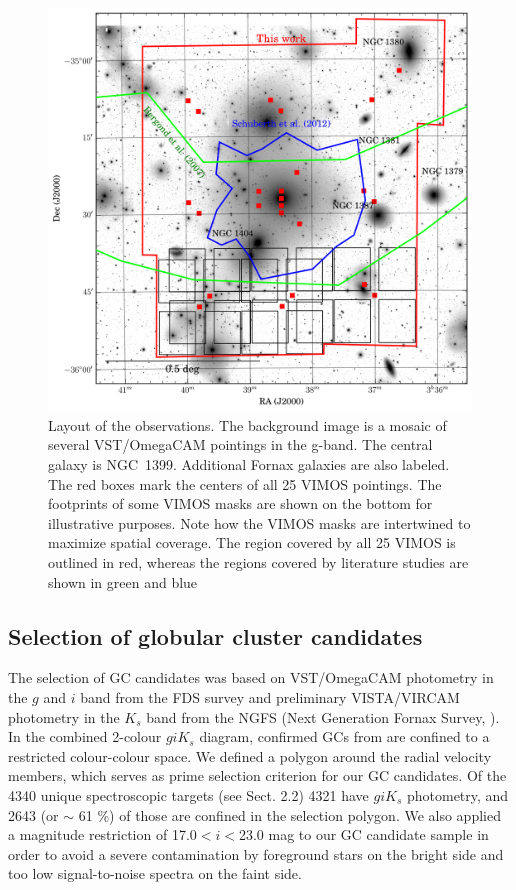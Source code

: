 \documentclass[useAMS,usenatbib]{mn2e}
\begin{document}
\begin{figure}
\centering
\includegraphics[scale=0.7]{figures/fov.png} 
\caption{Layout of the observations. The background image is a mosaic of several VST/OmegaCAM pointings in the g-band. The central galaxy is NGC~1399. Additional Fornax galaxies are also labeled. The red boxes mark the centers of all 25 VIMOS pointings. The footprints of some VIMOS masks are shown on the bottom for illustrative purposes. Note how the VIMOS masks are intertwined to maximize spatial coverage. The region covered by all 25 VIMOS is outlined in red, whereas the regions covered by literature studies are shown in green \citep{Bergond07} and blue \citep{Schuberth}}
\label{fig:fov}
\end{figure}

\subsection{Selection of globular cluster candidates}
\label{sec:selectionGC}
The selection of GC candidates was based on VST/OmegaCAM photometry in the $g$ and $i$ band from the FDS survey \citep{DAbrusco16,Iodice16} and preliminary VISTA/VIRCAM photometry in the $K_s$ band from the NGFS (Next Generation Fornax Survey, \citealt{Munoz14}). 
In the combined 2-colour $giK_s$ diagram, confirmed GCs from \citet{Schuberth} are confined to a restricted colour-colour space. 
We defined a polygon around the radial velocity members, which serves as prime selection criterion for our GC candidates. 
Of the 4340 unique spectroscopic targets (see Sect. 2.2) 4321 have $giK_s$ photometry, and 2643 (or $\sim$ 61 \%) of those are confined in the selection polygon. 
We also applied a magnitude restriction of 17.0$<i<$23.0 mag to our GC candidate sample in order to avoid a severe contamination by foreground stars on the bright side and too low signal-to-noise spectra on the faint side. 
\end{document}

